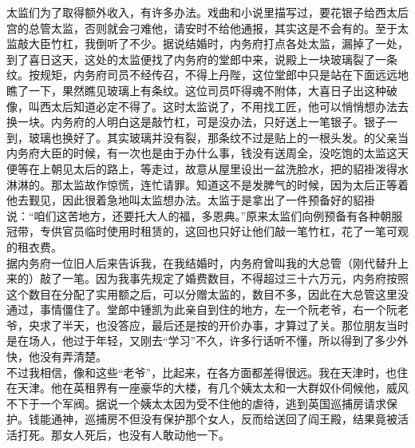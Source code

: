 太监们为了取得额外收入，有许多办法。戏曲和小说里描写过，要花银子给西太后宫的总管太监，否则就会刁难他，请安时不给他通报，其实这是不会有的。至于太监敲大臣竹杠，我倒听了不少。据说结婚时，内务府打点各处太监，漏掉了一处，到了喜日这天，这处的太监便找了内务府的堂郎中来，说殿上一块玻璃裂了一条纹。按规矩，内务府司员不经传召，不得上丹陛，这位堂郎中只是站在下面远远地瞧了一下，果然瞧见玻璃上有条纹。这位司员吓得魂不附体，大喜日子出这种破像，叫西太后知道必定不得了。这时太监说了，不用找工匠，他可以悄悄想办法去换一块。内务府的人明白这是敲竹杠，可是没办法，只好送上一笔银子。银子一到，玻璃也换好了。其实玻璃并没有裂，那条纹不过是贴上的一根头发。的父亲当内务府大臣的时候，有一次也是由于办什么事，钱没有送周全，没吃饱的太监这天便等在上朝见太后的路上，等走过，故意从屋里设出一盆洗脸水，把的貂褂泼得水淋淋的。那太监故作惊慌，连忙请罪。知道这不是发脾气的时候，因为太后正等着他去觐见，因此很着急地叫太监想办法。太监于是拿出了一件预备好的貂褂说：“咱们这苦地方，还要托大人的福，多恩典。”原来太监们向例预备有各种朝服冠带，专供官员临时使用时租赁的，这回也只好让他们敲一笔竹杠，花了一笔可观的租衣费。\\

据内务府一位旧人后来告诉我，在我结婚时，内务府曾叫我的大总管（刚代替升上来的）敲了一笔。因为我事先规定了婚费数目，不得超过三十六万元，内务府按照这个数目在分配了实用额之后，可以分赠太监的，数目不多，因此在大总管这里没通过，事情僵住了。堂郎中锺凯为此亲自到住的地方，左一个阮老爷，右一个阮老爷，央求了半天，也没答应，最后还是按的开价办事，才算过了关。那位朋友当时是在场人，他过于年轻，又刚去“学习”不久，许多行话听不懂，所以得到了多少外快，他没有弄清楚。\\

不过我相信，像和这些“老爷”，比起来，在各方面都差得很远。我在天津时，也住在天津。他在英租界有一座豪华的大楼，有几个姨太太和一大群奴仆伺候他，威风不下于一个军阀。据说一个姨太太因为受不住他的虐待，逃到英国巡捕房请求保护。钱能通神，巡捕房不但没有保护那个女人，反而给送回了阎王殿，结果竟被活活打死。那女人死后，也没有人敢动他一下。
